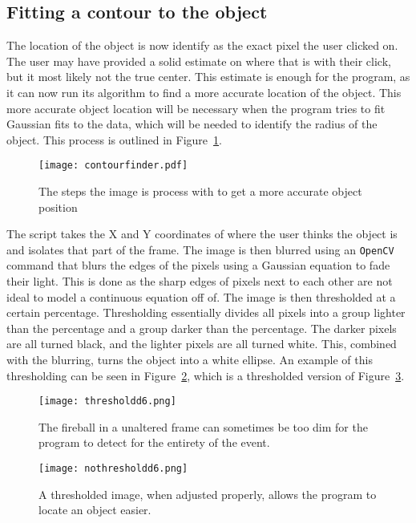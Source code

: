 \subsection{Fitting a contour to the object}
The location of the object is now identify as the exact pixel the user clicked on. The user may have provided a solid estimate on where that is with their click, but it most likely not the true center. This estimate is enough for the program, as it can now run its algorithm to find a more accurate location of the object. This more accurate object location will be necessary when the program tries to fit Gaussian fits to the data, which will be needed to identify the radius of the object. This process is outlined in Figure~\ref{fig:contourfinder}.

\begin{figure}[h!]
	\centering
	\texttt{[image: contourfinder.pdf]}
	\caption{The steps the image is process with to get a more accurate object position}
	\label{fig:contourfinder}
\end{figure}

The script takes the X and Y coordinates of where the user thinks the object is and isolates that part of the frame. The image is then blurred using an \texttt{OpenCV} command that blurs the edges of the pixels using a Gaussian equation to fade their light. This is done as the sharp edges of pixels next to each other are not ideal to model a continuous equation off of. The image is then thresholded at a certain percentage. Thresholding essentially divides all pixels into a group lighter than the percentage and a group darker than the percentage. The darker pixels are all turned black, and the lighter pixels are all turned white. This, combined with the blurring, turns the object into a white ellipse. An example of this thresholding can be seen in Figure~\ref{fig:nothresholdd6}, which is a thresholded version of Figure~\ref{fig:thresholdd6}. 

\begin{figure}[ht!]
	\centering
	\texttt{[image: thresholdd6.png]}
	\caption{The fireball in a unaltered frame can sometimes be too dim for the program to detect for the entirety of the event.}
	\label{fig:nothresholdd6}
\end{figure}

\begin{figure}[ht!]
	\centering
	\texttt{[image: nothresholdd6.png]}
	\caption{A thresholded image, when adjusted properly, allows the program to locate an object easier.}
	\label{fig:thresholdd6}
\end{figure}

